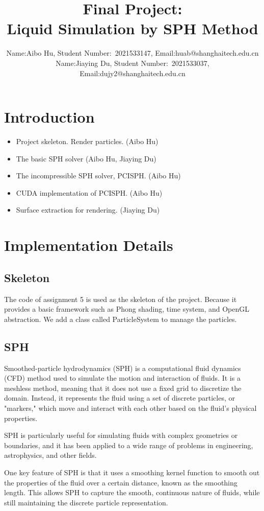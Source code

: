 \documentclass[acmtog]{acmart}
\title{Final Project:\\ {Liquid Simulation by SPH Method}}
\author{Name:\quad Aibo Hu, Student Number:\ 2021533147, Email:\quad huab@shanghaitech.edu.cn\\Name:\quad Jiaying Du, Student Number:\ 2021533037, Email:\quad dujy2@shanghaitech.edu.cn}
\begin{document}
\maketitle

\vspace*{2 ex}

\section{Introduction}
\begin{itemize}
	\item Project skeleton. Render particles. (Aibo Hu)
	\item The basic SPH solver (Aibo Hu, Jiaying Du)
	\item The incompressible SPH solver, PCISPH. (Aibo Hu)
	\item CUDA implementation of PCISPH. (Aibo Hu)
	\item Surface extraction for rendering. (Jiaying Du)
\end{itemize}
\section{Implementation Details}

\subsection{Skeleton}
The code of assignment 5 is used as the skeleton of the project.
Because it provides a basic framework such as Phong shading, time system, and OpenGL abstraction.
We add a class called ParticleSystem to manage the particles.
\subsection{SPH}

Smoothed-particle hydrodynamics (SPH) is a computational fluid dynamics (CFD) method used to simulate the motion and interaction of fluids. It is a meshless method, meaning that it does not use a fixed grid to discretize the domain. Instead, it represents the fluid using a set of discrete particles, or "markers," which move and interact with each other based on the fluid's physical properties.

SPH is particularly useful for simulating fluids with complex geometries or boundaries, and it has been applied to a wide range of problems in engineering, astrophysics, and other fields.

One key feature of SPH is that it uses a smoothing kernel function to smooth out the properties of the fluid over a certain distance, known as the smoothing length. This allows SPH to capture the smooth, continuous nature of fluids, while still maintaining the discrete particle representation.
\end{document}
